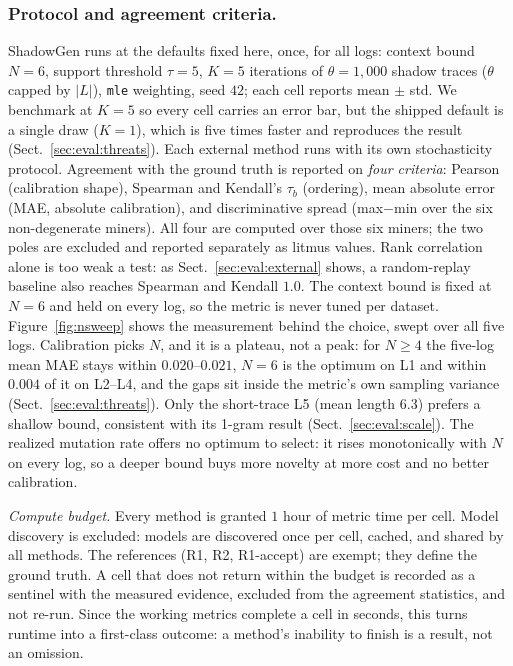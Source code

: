 \documentclass[runningheads]{llncs}
\begin{document}
\subsubsection{Protocol and agreement criteria.}
ShadowGen runs at the defaults fixed here, once, for all logs: context bound $N{=}6$, support threshold $\tau{=}5$, $K{=}5$ iterations of $\theta{=}1{,}000$ shadow traces ($\theta$ capped by $|L|$), \texttt{mle} weighting, seed $42$; each cell reports mean $\pm$ std. We benchmark at $K{=}5$ so every cell carries an error bar, but the shipped default is a single draw ($K{=}1$), which is five times faster and reproduces the result (Sect.~\ref{sec:eval:threats}). Each external method runs with its own stochasticity protocol. Agreement with the ground truth is reported on \emph{four criteria}: Pearson (calibration shape), Spearman and Kendall's $\tau_b$ (ordering), mean absolute error (MAE, absolute calibration), and discriminative spread (max$-$min over the six non-degenerate miners). All four are computed over those six miners; the two poles are excluded and reported separately as litmus values. Rank correlation alone is too weak a test: as Sect.~\ref{sec:eval:external} shows, a random-replay baseline also reaches Spearman and Kendall $1.0$. The context bound is fixed at $N{=}6$ and held on every log, so the metric is never tuned per dataset. Figure~\ref{fig:nsweep} shows the measurement behind the choice, swept over all five logs. Calibration picks $N$, and it is a plateau, not a peak: for $N\ge4$ the five-log mean MAE stays within $0.020$--$0.021$, $N{=}6$ is the optimum on L1 and within $0.004$ of it on L2--L4, and the gaps sit inside the metric's own sampling variance (Sect.~\ref{sec:eval:threats}). Only the short-trace L5 (mean length $6.3$) prefers a shallow bound, consistent with its 1-gram result (Sect.~\ref{sec:eval:scale}). The realized mutation rate offers no optimum to select: it rises monotonically with $N$ on every log, so a deeper bound buys more novelty at more cost and no better calibration.

\emph{Compute budget.} Every method is granted $1$ hour of metric time per cell. Model discovery is excluded: models are discovered once per cell, cached, and shared by all methods. The references (R1, R2, R1-accept) are exempt; they define the ground truth. A cell that does not return within the budget is recorded as a sentinel with the measured evidence, excluded from the agreement statistics, and not re-run. Since the working metrics complete a cell in seconds, this turns runtime into a first-class outcome: a method's inability to finish is a result, not an omission.
\end{document}
